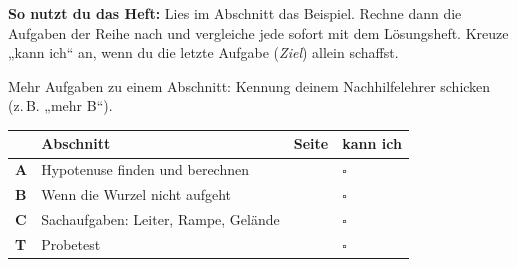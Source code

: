 \documentclass[11pt]{article}
\begin{document}
\par\smallskip
{}\par\medskip
\noindent\textbf{So nutzt du das Heft:} Lies im Abschnitt das Beispiel. Rechne dann die Aufgaben der Reihe nach und vergleiche jede sofort mit dem Lösungsheft. Kreuze „kann ich“ an, wenn du die letzte Aufgabe (\emph{Ziel}) allein schaffst.\par
\noindent Mehr Aufgaben zu einem Abschnitt: Kennung deinem Nachhilfelehrer schicken (z.\,B. „mehr B“).\par\medskip
{\renewcommand{\arraystretch}{1.3}
\noindent\begin{tabular}{|>{\bfseries}p{10mm}|p{112mm}|>{\raggedleft\arraybackslash}p{10mm}|>{\centering\arraybackslash}p{14mm}|}\hline
\rowcolor{black!8} & \textbf{Abschnitt} & \textbf{Seite} & \textbf{kann ich}\\\hline
A & Hypotenuse finden und berechnen & \pageref{s:A} & $\square$\\\hline
B & Wenn die Wurzel nicht aufgeht & \pageref{s:B} & $\square$\\\hline
C & Sachaufgaben: Leiter, Rampe, Gelände & \pageref{s:C} & $\square$\\\hline
T & Probetest & \pageref{s:T} & $\square$\\\hline
\end{tabular}}\par\bigskip
\end{document}
